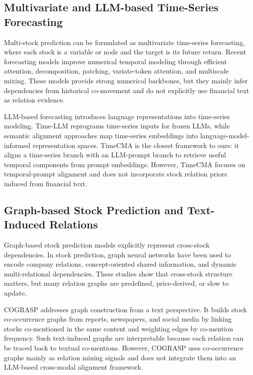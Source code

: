 \subsection{Multivariate and LLM-based Time-Series Forecasting}

Multi-stock prediction can be formulated as multivariate time-series forecasting, where each stock is a variable or node and the target is its future return. Recent forecasting models improve numerical temporal modeling through efficient attention, decomposition, patching, variate-token attention, and multiscale mixing. These models provide strong numerical backbones, but they mainly infer dependencies from historical co-movement and do not explicitly use financial text as relation evidence.

LLM-based forecasting introduces language representations into time-series modeling. Time-LLM reprograms time-series inputs for frozen LLMs, while semantic alignment approaches map time-series embeddings into language-model-informed representation spaces. TimeCMA is the closest framework to ours: it aligns a time-series branch with an LLM-prompt branch to retrieve useful temporal components from prompt embeddings. However, TimeCMA focuses on temporal-prompt alignment and does not incorporate stock relation priors induced from financial text.

\subsection{Graph-based Stock Prediction and Text-Induced Relations}

Graph-based stock prediction models explicitly represent cross-stock dependencies. In stock prediction, graph neural networks have been used to encode company relations, concept-oriented shared information, and dynamic multi-relational dependencies. These studies show that cross-stock structure matters, but many relation graphs are predefined, price-derived, or slow to update.

COGRASP addresses graph construction from a text perspective. It builds stock co-occurrence graphs from reports, newspapers, and social media by linking stocks co-mentioned in the same content and weighting edges by co-mention frequency. Such text-induced graphs are interpretable because each relation can be traced back to textual co-mentions. However, COGRASP uses co-occurrence graphs mainly as relation mining signals and does not integrate them into an LLM-based cross-modal alignment framework.

